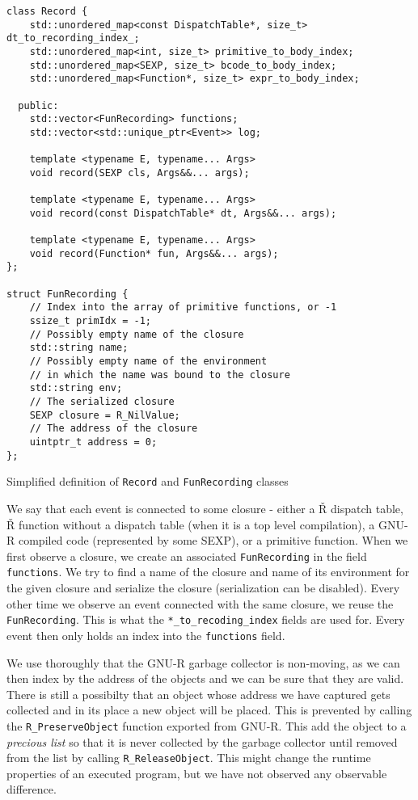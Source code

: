 \begin{listing}
	\begin{verbatim}
class Record {
    std::unordered_map<const DispatchTable*, size_t> dt_to_recording_index_;
    std::unordered_map<int, size_t> primitive_to_body_index;
    std::unordered_map<SEXP, size_t> bcode_to_body_index;
    std::unordered_map<Function*, size_t> expr_to_body_index;

  public:
    std::vector<FunRecording> functions;
    std::vector<std::unique_ptr<Event>> log;

    template <typename E, typename... Args>
    void record(SEXP cls, Args&&... args);

    template <typename E, typename... Args>
    void record(const DispatchTable* dt, Args&&... args);

    template <typename E, typename... Args>
    void record(Function* fun, Args&&... args);
};

struct FunRecording {
    // Index into the array of primitive functions, or -1
    ssize_t primIdx = -1;
    // Possibly empty name of the closure
    std::string name;
    // Possibly empty name of the environment
    // in which the name was bound to the closure
    std::string env;
    // The serialized closure
    SEXP closure = R_NilValue;
    // The address of the closure
    uintptr_t address = 0;
};
  \end{verbatim}
	\caption{Simplified definition of \texttt{Record} and \texttt{FunRecording} classes }\label{lst:record-class}
\end{listing}

We say that each event is connected to some closure - either a Ř dispatch table, Ř function without a dispatch table (when it is a top level compilation), a GNU-R compiled code (represented by some SEXP), or a primitive function. When we first observe a closure, we create an associated \texttt{FunRecording} in the field \texttt{functions}. We try to find a name of the closure and name of its environment for the given closure and serialize the closure (serialization can be disabled). Every other time we observe an event connected with the same closure, we reuse the \texttt{FunRecording}. This is what the \texttt{*\_to\_recoding\_index} fields are used for. Every event then only holds an index into the \texttt{functions} field.

We use thoroughly that the GNU-R garbage collector is non-moving, as we can then index by the address of the objects and we can be sure that they are valid. There is still a possibilty that an object whose address we have captured gets collected and in its place a new object will be placed. This is prevented by calling the \texttt{R\_PreserveObject} function exported from GNU-R. This add the object to a \textit{precious list} so that it is never collected by the garbage collector until removed from the list by calling \texttt{R\_ReleaseObject}. This might change the runtime properties of an executed program, but we have not observed any observable difference.

